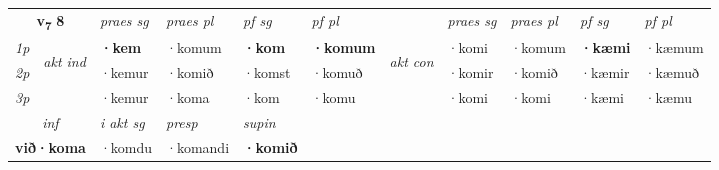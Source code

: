 \noindent
\begin{tabular}{lllllllllll} \toprule
\multicolumn{2}{c}{\textbf{v{\textsubscript{7}}} \Large{\textbf{8}}}  &  \textit{praes sg}  & \textit{praes pl}  &\textit{ pf sg} & \textit{pf pl} &  &  \textit{praes sg}  & \textit{praes pl}  & \textit{pf sg} & \textit{pf pl } \\*
	\cmidrule{3-6} \cmidrule{8-11}
 {\textit{1p}} & \multirow{3}{*}{\begin{turn}{90}\textit{akt ind}\end{turn}} & \textbf{·kem} & ·komum & \textbf{·kom} & \textbf{·komum} & \multirow{3}{*}{\begin{turn}{90}\textit{akt con}\end{turn}} &·komi & ·komum & \textbf{·kæmi} & ·kæmum\\*
 {\textit{2p}} &  &  ·kemur  & ·komið & ·komst & ·komuð & & ·komir & ·komið & ·kæmir & ·kæmuð \\*
{\textit{3p}} &  & ·kemur & ·koma & ·kom & ·komu & & ·komi & ·komi& ·kæmi & ·kæmu \\*
\cmidrule{3-6} \cmidrule{8-11}

   \multicolumn{2}{c}{\textit{inf}}  & \textit{i akt sg}    & \textit{presp} & \textit{supin}   \\*
  \multicolumn{2}{c}{\textbf{við\allowbreak ·koma}} & ·komdu     & ·komandi &  \textbf{·komið}   \\*
\end{tabular}

